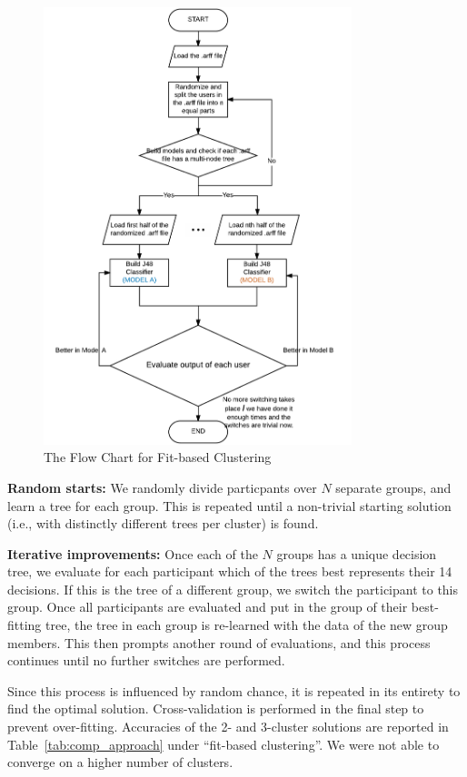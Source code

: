\begin{figure}[htp]
	\centering
	\includegraphics[width=0.8\textwidth]{figures/flowchartFit.png}
	\caption{The Flow Chart for Fit-based Clustering}
	\label{fig:flow_chart_fit}
\end{figure}

\textbf{Random starts:} We randomly divide particpants over $N$ separate groups, and learn a tree for each group. This is repeated until a non-trivial starting solution (i.e., with distinctly different trees per cluster) is found. 

\textbf{Iterative improvements:} Once each of the $N$ groups has a unique decision tree, we evaluate for each participant which of the trees best represents their 14 decisions. If this is the tree of a different group, we switch the participant to this group. Once all participants are evaluated and put in the group of their best-fitting tree, the tree in each group is re-learned with the data of the new group members. This then prompts another round of evaluations, and this process continues until no further switches are performed. 

Since this process is influenced by random chance, it is repeated in its entirety to find the optimal solution. Cross-validation is performed in the final step to prevent over-fitting. Accuracies of the 2- and 3-cluster solutions are reported in Table~\ref{tab:comp_approach} under ``fit-based clustering''. We were not able to converge on a higher number of clusters. 

